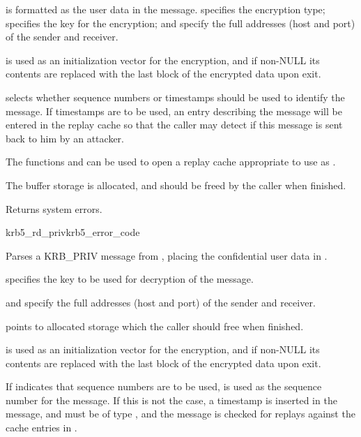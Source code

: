  is formatted as the user data in the message.
 specifies the encryption type; 
specifies the key for the encryption;  and
 specify the full addresses (host and port) of the
sender and receiver.

 is used as an initialization vector for the
encryption, and if non-NULL its contents are replaced with the last
block of the encrypted data upon exit.

 selects whether sequence numbers or timestamps
should be used to identify the message.  If timestamps are to be used,
an entry describing the message will be entered in the replay cache
 so that the caller may detect if this message is sent
back to him by an attacker.

The functions  and
 can be used to open a replay cache
appropriate to use as .

The  buffer storage is allocated, and should be freed by the
caller when finished.

Returns system errors.

\begin{funcdecl}{krb5_rd_priv}{krb5_error_code}{\funcin}
\funcinout
{}
\funcout
{}
\end{funcdecl}

Parses a KRB_PRIV message from , placing the confidential user
data in .

 specifies the key to be used for decryption of the message.
 
 and  specify the full
addresses (host and port) of the sender and receiver.

 points to allocated storage which the caller should
free when finished.

 is used as an initialization vector for the
encryption, and if non-NULL its contents are replaced with the last
block of the encrypted data upon exit.

If  indicates that sequence numbers are to be
used,  is used as the sequence number for the
message.  If this is not the case, a timestamp is inserted in the
message, and  must be of type
, and the message is checked for replays
against the cache entries in .

